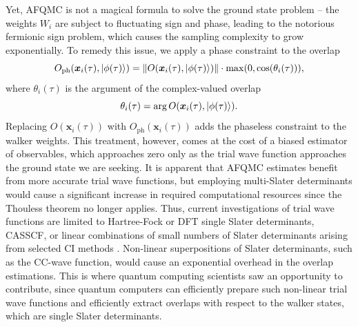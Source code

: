 \documentclass[../main.tex]{subfiles}
\begin{document}
Yet, AFQMC is not a magical formula to solve the ground state problem -- the weights $W_i$ are subject to fluctuating sign and phase, leading to the notorious fermionic sign problem, which causes the sampling complexity to grow exponentially. To remedy this issue, we apply a phase constraint to the overlap
\begin{equation}
    O_{\mathrm{ph}}(\bm{x}_i(\tau), \ket{\phi(\tau)}) = \| O(\bm{x}_i(\tau), \ket{\phi(\tau)})\| \cdot \max(0, \cos(\theta_i(\tau))),
\end{equation} where $\theta_i(\tau)$  is the argument of the complex-valued overlap
\begin{equation}
    \theta_i(\tau) = \arg O(\bm{x}_i(\tau), \ket{\phi(\tau)}).
\end{equation}
Replacing $O(\bm{x}_i(\tau))$ with $O_{\mathrm{ph}}(\bm{x}_i(\tau))$ adds the phaseless constraint to the walker weights. This treatment, however, comes at the cost of a biased estimator of observables, which approaches zero only as the trial wave function approaches the ground state we are seeking. It is apparent that AFQMC estimates benefit from more accurate trial wave functions, but employing multi-Slater determinants would cause a significant increase in required computational resources since the Thouless theorem no longer applies. Thus, current investigations of trial wave functions are limited to Hartree-Fock or DFT single Slater determinants, \ac{CASSCF}, or linear combinations of small numbers of Slater determinants arising from selected CI methods \cite{lee2022twenty}.  Non-linear superpositions of Slater determinants, such as the CC-wave function, would cause an exponential overhead in the overlap estimations. This is where quantum computing scientists \cite{huggins2022unbiasing} saw an opportunity to contribute, since quantum computers can efficiently prepare such non-linear trial wave functions and efficiently extract overlaps with respect to the walker states, which are single Slater determinants.
\end{document}
